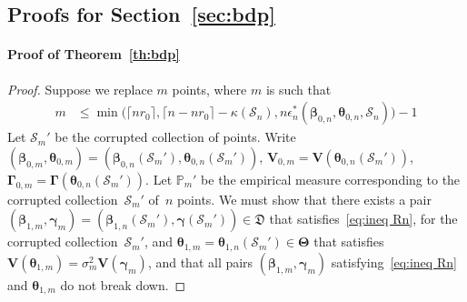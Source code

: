 \documentclass{article}
\numberwithin{equation}{section}
\theoremstyle{plain}
\newcommand{\bbeta}{\bm\beta}
\newcommand{\btheta}{\bm\theta}
\newcommand{\bgamma}{\bm\gamma}
\newcommand{\bGamma}{\bm\Gamma}
\newcommand{\bTheta}{\bm\Theta}
\newcommand{\bV}{\mathbf{V}}
\begin{document}
\subsection{Proofs for Section~\ref{sec:bdp}}

\paragraph*{Proof of Theorem~\ref{th:bdp}}
\begin{proof}
Suppose we replace $m$ points, where $m$ is such that
\[
\begin{split}
m&\leq 
\min\Big(
\lceil nr_0\rceil,
\lceil n-nr_0\rceil-\kappa(\mathcal{S}_n),
n\epsilon_n^*(\bbeta_{0,n},\btheta_{0,n},\mathcal{S}_n)
\Big)
-1
\end{split}
\]
Let $\mathcal{S}_m'$ be the corrupted collection of points.
Write $(\bbeta_{0,m},\btheta_{0,m})=(\bbeta_{0,n}(\mathcal{S}_m'),\btheta_{0,n}(\mathcal{S}_m'))$,
$\bV_{0,m}=\bV(\btheta_{0,n}(\mathcal{S}_m'))$, 
$\bGamma_{0,m}=\bGamma(\btheta_{0,n}(\mathcal{S}_m'))$.
Let $\mathbb{P}_m'$ be the empirical measure corresponding to the
corrupted collection~$\mathcal{S}_m'$ of~$n$ points.
We must show that there exists a pair
$(\bbeta_{1,m},\bgamma_m)=(\bbeta_{1,n}(\mathcal{S}_m'),\bgamma(\mathcal{S}_m'))\in \mathfrak{D}$ 
that satisfies~\eqref{eq:ineq Rn}, for the corrupted collection~$\mathcal{S}_m'$,
and $\btheta_{1,m}=\btheta_{1,n}(\mathcal{S}_m')\in\bTheta$ 
that satisfies $\bV(\btheta_{1,m})=\sigma_m^2\bV(\bgamma_m)$,
and that all pairs $(\bbeta_{1,m},\bgamma_m)$ satisfying~\eqref{eq:ineq Rn} and $\btheta_{1,m}$ do not break down.


\end{proof}
\end{document}
